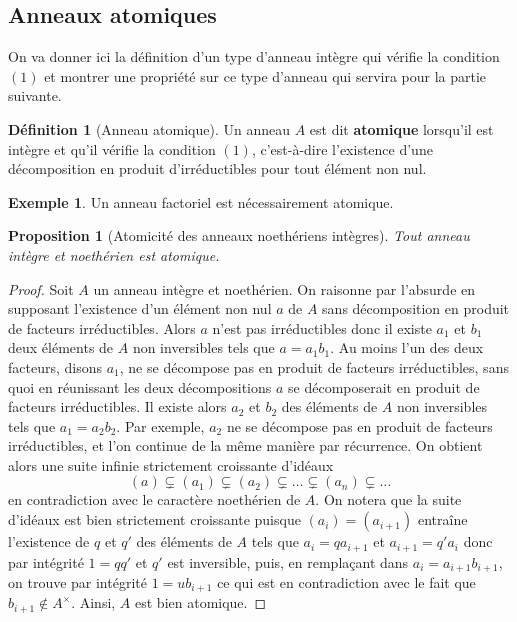 \documentclass[french]{book}
\theoremstyle{plain}
\newtheorem{prop}{Proposition}[chapter]
\theoremstyle{definition}
\newtheorem{dfn}{Définition}[chapter]
\newtheorem{exa}{Exemple}[chapter]
\theoremstyle{remark}
\begin{document}
\subsection{Anneaux atomiques}
On va donner ici la définition d'un type d'anneau intègre qui vérifie la condition $(1)$ et montrer une propriété sur ce type d'anneau qui servira pour la partie suivante.
\begin{dfn}[Anneau atomique]
	Un anneau $A$ est dit \textbf{atomique} lorsqu'il est intègre et qu'il vérifie la condition $(1)$, c'est-à-dire l'existence d'une décomposition en produit d'irréductibles pour tout élément non nul.
\end{dfn}
\begin{exa}
	Un anneau factoriel est nécessairement atomique.
\end{exa}
\begin{prop}[Atomicité des anneaux noethériens intègres]
	Tout anneau intègre et noethérien est atomique.
\end{prop}
\begin{proof}
	Soit $A$ un anneau intègre et noethérien. On raisonne par l'absurde en supposant l'existence d'un élément non nul $a$ de $A$ sans décomposition en produit de facteurs irréductibles. Alors $a$ n'est pas irréductibles donc il existe $a_1$ et $b_1$ deux éléments de $A$ non inversibles tels que $a=a_1b_1$.  Au moins l'un des deux facteurs, disons $a_1$, ne se décompose pas en produit de facteurs irréductibles, sans quoi en réunissant les deux décompositions $a$ se décomposerait en produit de facteurs irréductibles. Il existe alors $a_2$ et $b_2$ des éléments de $A$ non inversibles tels que $a_1=a_2b_2$. Par exemple, $a_2$ ne se décompose pas en produit de facteurs irréductibles, et l'on continue de la même manière par récurrence. On obtient alors une suite infinie strictement croissante d'idéaux $$(a)\subsetneq(a_1)\subsetneq(a_2)\subsetneq\ldots\subsetneq(a_n)\subsetneq\ldots$$ en contradiction avec le caractère noethérien de $A$. On notera  que la suite d'idéaux est bien strictement croissante puisque $(a_i)=(a_{i+1})$ entraîne l'existence de $q$ et $q'$ des éléments de $A$ tels que $a_i=qa_{i+1}$ et $a_{i+1}=q'a_i$ donc par intégrité $1=qq'$ et $q'$ est inversible, puis, en remplaçant dans $a_i=a_{i+1}b_{i+1}$, on trouve par intégrité $1=ub_{i+1}$ ce qui est en contradiction avec le fait que $b_{i+1}\notin A^\times$. Ainsi, $A$ est bien atomique. 
\end{proof}
\end{document}
